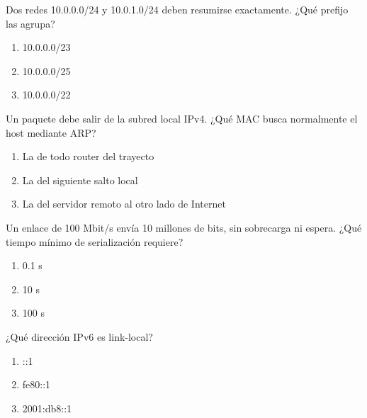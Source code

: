 \noindent\begin{minipage}{\linewidth}\setlength{\parskip}{4pt}\label{q:R-013}
Dos redes 10.0.0.0/24 y 10.0.1.0/24 deben resumirse exactamente. ¿Qué prefijo las agrupa?
\begin{enumerate}[label=\Alph*),nosep]
\item 10.0.0.0/23
\item 10.0.0.0/25
\item 10.0.0.0/22
\end{enumerate}\end{minipage}\par\medskip

\noindent\begin{minipage}{\linewidth}\setlength{\parskip}{4pt}\label{q:R-014}
Un paquete debe salir de la subred local IPv4. ¿Qué MAC busca normalmente el host mediante ARP?
\begin{enumerate}[label=\Alph*),nosep]
\item La de todo router del trayecto
\item La del siguiente salto local
\item La del servidor remoto al otro lado de Internet
\end{enumerate}\end{minipage}\par\medskip

\noindent\begin{minipage}{\linewidth}\setlength{\parskip}{4pt}\label{q:R-015}
Un enlace de 100 Mbit/s envía 10 millones de bits, sin sobrecarga ni espera. ¿Qué tiempo mínimo de serialización requiere?
\begin{enumerate}[label=\Alph*),nosep]
\item 0.1 s
\item 10 s
\item 100 s
\end{enumerate}\end{minipage}\par\medskip

\noindent\begin{minipage}{\linewidth}\setlength{\parskip}{4pt}\label{q:R-016}
¿Qué dirección IPv6 es link-local?
\begin{enumerate}[label=\Alph*),nosep]
\item ::1
\item fe80::1
\item 2001:db8::1
\end{enumerate}\end{minipage}\par\medskip

